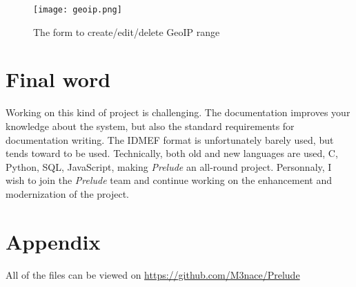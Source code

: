 \documentclass{koala-en}
\begin{document}
\begin{figure}[!ht]
  \center
  \texttt{[image: geoip.png]}
  \caption{The form to create/edit/delete GeoIP range}
\end{figure}

\chapter{Final word}

Working on this kind of project is challenging. The documentation improves your knowledge about the system, but also the standard requirements for documentation writing. The IDMEF format is unfortunately barely used, but tends toward to be used. Technically, both old and new languages are used, C, Python, SQL, JavaScript, making \emph{Prelude} an all-round project.
\newline
\newline
Personnaly, I wish to join the \emph{Prelude} team and continue working on the enhancement and modernization of the project.

\thispagestyle{fancy}
\newpage

\printglossary[style=altlisthypergroup]
\thispagestyle{fancy}

\chapter{Appendix}

All of the files can be viewed on \url{https://github.com/M3nace/Prelude}
\end{document}
